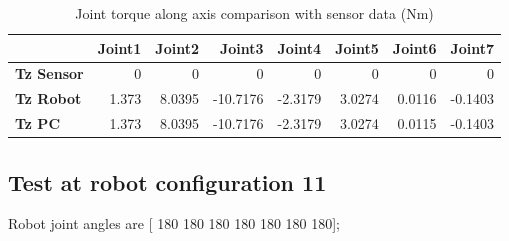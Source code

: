 \begin{table}[h!]
	\centering
	\caption{Joint torque along axis comparison with sensor data (Nm)}
	\label{wrech_Sensor_Pose10}
	\begin{tabular}{|l|r|r|r|r|r|r|r|}
		\hline
		\textbf{} & \textbf{Joint1} & \textbf{Joint2} & \textbf{Joint3} & \textbf{Joint4} & \textbf{Joint5} & \textbf{Joint6} & \textbf{Joint7} \\ \hline
		\textbf{Tz Sensor}  & 0           & 0           & 0            & 0           & 0           & 0           & 0           \\ \hline
		\textbf{Tz Robot}  	& 1.373           & 8.0395           & -10.7176            & -2.3179           & 3.0274           & 0.0116           & -0.1403           \\ \hline
		\textbf{Tz PC}  	& 1.373           & 8.0395           & -10.7176            & -2.3179           & 3.0274           & 0.0115           & -0.1403           \\ \hline
	\end{tabular}
\end{table}


\subsection{Test at robot configuration 11}
Robot joint angles are  [ 180  180  180  180  180  180  180];

